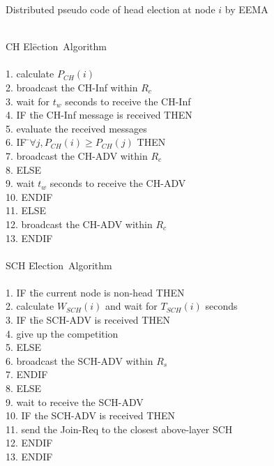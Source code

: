 \documentclass[journal]{IEEEtran}
\begin{document}
\begin{algorithm}
\caption{Distributed pseudo code of head election at node $i$ by EEMA}
\begin{tabbing}
\label{EEMA}
\\
 CH El\=ection~Algorithm \\
\\
1. \> calculate $P_{CH}(i)$\\
2. \> broadcast the CH-Inf within $R_{c}$\\
3. \> wait for $t_{w}$ seconds to receive the CH-Inf\\
4. \> IF t\=he CH-Inf message is received THEN\\
5. \>\> evaluate the received messages\\
6. \>\> IF \=$\forall j, P_{CH}(i) \geq P_{CH}(j)$ THEN\\
7. \>\>\> broadcast the CH-ADV within $R_{c}$\\
8. \>\> ELSE\=\\
9. \>\>\> wait $t_{w}$ seconds to receive the CH-ADV\\
10. \>\> ENDIF\\
11. \> ELSE\=\\
12. \>\> broadcast the CH-ADV within $R_{c}$\\
13. \> ENDIF \\
\\
 SCH E\=lection~Algorithm \\
\\
1. \>IF t\=he current node is non-head THEN\\
2. \>\> calculate $W_{SCH}(i)$ and wait for $T_{SCH}(i)$ seconds\\
3. \>\> IF t\=he SCH-ADV is received THEN\\
4. \>\>\> give up the competition\\
5. \>\> ELSE\=\\
6. \>\>\> broadcast the SCH-ADV within $R_{s}$\\
7. \>\> ENDIF\\
8. \> ELSE\=\\
9.\>\> wait to receive the SCH-ADV\\
10.\>\> IF the SCH-ADV is received THEN\\
11.\>\>\> send the Join-Req to the closest above-layer SCH\\
12.\>\> ENDIF\\
13. \> ENDIF\\

\end{tabbing}
\end{algorithm}
\end{document}
